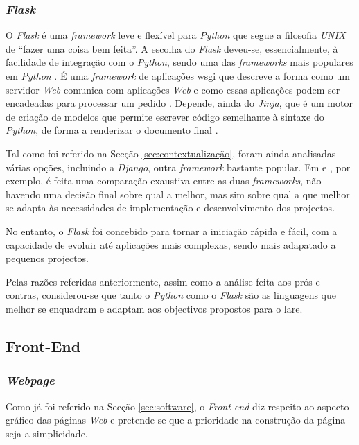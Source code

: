 \subsubsection{\textit{Flask}}
O \textit{Flask} é uma \textit{framework} leve e flexível para \textit{Python} que segue a filosofia \textit{UNIX} de ``fazer uma coisa bem feita''. A escolha do \textit{Flask} deveu-se, essencialmente, à facilidade de integração com o \textit{Python}, sendo uma das \textit{frameworks} mais populares em \textit{Python} \cite{Flask}. É uma \textit{framework} de aplicações \acrfull{wsgi} que descreve a forma como um servidor \textit{Web} comunica com aplicações \textit{Web} e como essas aplicações podem ser encadeadas para processar um pedido \cite{wsgi}. Depende, ainda do  \textit{Jinja}, que é um motor de criação de modelos que permite escrever código semelhante à sintaxe do \textit{Python}, de forma a renderizar o documento final \cite{Jinja}.

Tal como foi referido na Secção \ref{sec:contextualização}, foram ainda analisadas várias opções, incluindo a \textit{Django}, outra \textit{framework} bastante popular. Em \cite{Djangovsflask} e \cite{FlaskvsDjango}, por exemplo, é feita uma comparação exaustiva entre as duas \textit{frameworks}, não havendo uma decisão final sobre qual a melhor, mas sim sobre qual a que melhor se adapta às necessidades de implementação e desenvolvimento dos projectos.

No entanto, o \textit{Flask} foi concebido para tornar a iniciação rápida e fácil, com a capacidade de evoluir até aplicações mais complexas, sendo mais adapatado a pequenos projectos.

Pelas razões referidas anteriormente, assim como a análise feita aos prós e contras, considerou-se que tanto o \textit{Python} como o \textit{Flask} são as linguagens que melhor se enquadram e adaptam aos objectivos propostos para o \acrshort{lare}.

\subsection{Front-End}
\subsubsection{\textit{Webpage}}
Como já foi referido na Secção \ref{sec:software}, o \textit{Front-end} diz respeito ao aspecto gráfico das páginas \textit{Web} e pretende-se que a prioridade na construção da página seja a simplicidade.

